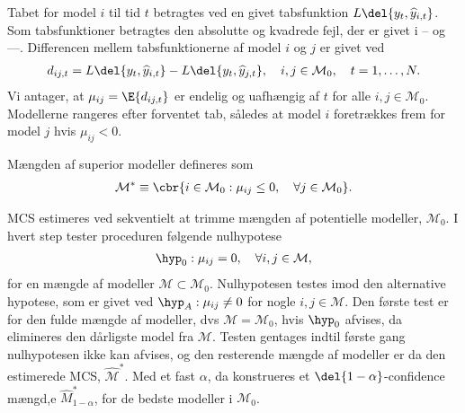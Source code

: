 Tabet for model \(i\) til tid \(t\) betragtes ved en givet tabsfunktion \(L \del{y_t, \widehat{y}_{i,t}}\). 
Som tabsfunktioner betragtes den absolutte og kvadrede fejl, der er givet i -- og ---.
Differencen mellem tabsfunktionerne af model \(i\) og \(j\) er givet ved
\begin{align*}
d_{ij,t} = L \del{y_t, \widehat{y}_{i,t}} - L \del{y_t, \widehat{y}_{j,t}}, \quad i, j \in \mathcal{M}_0, \quad t = 1, \ldots, N.
\end{align*}
Vi antager, at \(\mu_{ij} = \E{d_{ij,t}}\) er endelig og uafhængig af \(t\) for alle \( i, j \in \mathcal{M}_0\).
Modellerne rangeres efter forventet tab, således at model \(i\) foretrækkes frem for model \(j\) hvis \(\mu_{ij} < 0\).
%
\begin{defn}
Mængden af superior modeller defineres som
\begin{align*}
\mathcal{M}^* \equiv \cbr{i \in \mathcal{M}_0 : \mu_{ij} \leq 0, \quad \forall j \in \mathcal{M}_0}. 
\end{align*}
\end{defn}
%
MCS estimeres ved sekventielt at trimme mængden af potentielle modeller, \(\mathcal{M}_0\).
I hvert step tester proceduren følgende nulhypotese
\begin{align*}
\hyp_0: \mu_{ij} = 0, \quad \forall i,j \in \mathcal{M},
\end{align*}
for en mængde af modeller \(\mathcal{M} \subset \mathcal{M}_0\).
Nulhypotesen testes imod den alternative hypotese, som er givet ved \(\hyp_A: \mu_{ij} \neq 0\) for nogle \(i, j \in \mathcal{M}\).
Den første test er for den fulde mængde af modeller, dvs \(\mathcal{M} = \mathcal{M}_0\), hvis \(\hyp_0\) afvises, da elimineres den dårligste model fra \(\mathcal{M}\).
Testen gentages indtil første gang nulhypotesen ikke kan afvises, og den resterende mængde af modeller er da den estimerede MCS, \(\widehat{\mathcal{M}}^*\).
Med et fast \(\alpha\), da konstrueres et \(\del{1-\alpha}\)-confidence mængd,e \(\widehat{M}^*_{1-\alpha}\), for de bedste modeller i \(\mathcal{M}_0\).

